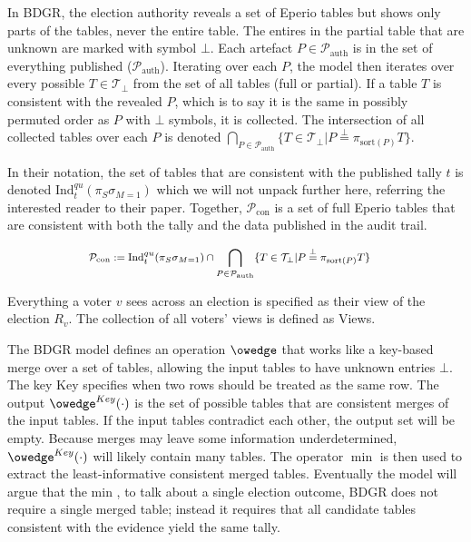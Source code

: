 
In BDGR, the election authority reveals a set of Eperio tables but shows only parts of the tables, never the entire table. The entires in the partial table that are unknown are marked with symbol $\bot$. Each artefact $P\in \mathcal{P}_{\mathrm{auth}}$ is in the set of everything published ($\mathcal{P}_{\mathrm{auth}}$). Iterating over each $P$, the model then iterates over every possible $T \in \mathcal{T}_\bot$ from the set of all tables (full or partial). If a table $T$ is consistent with the revealed $P$, which is to say it is the same in possibly permuted order as $P$ with $\bot$ symbols, it is collected. The intersection of all collected tables over each $P$ is denoted $\bigcap_{P\in \mathcal{P}_{\mathrm{auth}}}\{T\in\mathcal{T}_\bot|P\stackrel{\bot}{=}\pi_{\mathrm{sort}(P)}T\}$.

In their notation, the set of tables that are consistent with the published tally $t$ is denoted $\mathrm{Ind}^{qu}_t(\pi_S\sigma_{M=1})$ which we will not unpack further here, referring the interested reader to their paper. Together, $\mathcal{P}_{\mathrm{con}}$ is a set of full Eperio tables that are consistent with both the tally and the data published in the audit trail.

\begin{mdframed}[linewidth=0.6pt,backgroundcolor=verylightblue,innerleftmargin=6pt,innerrightmargin=6pt,innertopmargin=4pt,innerbottommargin=4pt]
\[
\footnotesize
\begin{aligned}
\mathcal{P}_{\mathrm{con}}&:=\mathrm{Ind}^{qu}_t(\pi_S\sigma_{M=1}) \cap \bigcap_{P\in \mathcal{P}_{\mathrm{auth}}}\{T\in\mathcal{T}_\bot|P\stackrel{\bot}{=}\pi_{\mathrm{sort}(P)}T\}
\end{aligned}
\]
\end{mdframed}

Everything a voter $v$ sees across an election is specified as their view of the election $R_v$. The collection of all voters' views is defined as Views.

The BDGR model defines an operation $\owedge$ that works like a key-based merge over a set of tables, allowing the input tables to have unknown entries $\bot$. The key Key specifies when two rows should be treated as the same row. The output $\owedge^{Key}(\cdot)$ is the set of possible tables that are consistent merges of the input tables. If the input tables contradict each other, the output set will be empty. Because merges may leave some information underdetermined, $\owedge^{Key}(\cdot)$ will likely contain many tables. The operator $\min$ is then used to extract the least-informative consistent merged tables. Eventually the model will argue that the min , to talk about a single election outcome, BDGR does not require a single merged table; instead it requires that all candidate tables consistent with the evidence yield the same tally.

